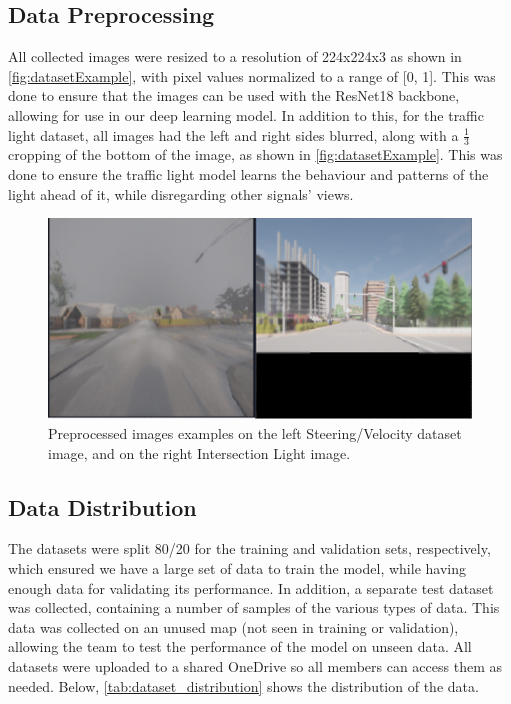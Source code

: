 \documentclass{article} %
\begin{document}
\subsection{Data Preprocessing}

All collected images were resized to a resolution of 224x224x3 as shown in \autoref{fig:datasetExample}, with pixel values normalized to a range of [0, 1].
This was done to ensure that the images can be used with the ResNet18 backbone, allowing for use in our deep learning model. In addition to this, for the traffic light dataset, all images had the left and right sides blurred, along with a \(\frac{1}{3}\) cropping of the bottom of the image, as shown in \autoref{fig:datasetExample}. This was done to ensure the traffic light model learns the behaviour and patterns of the light ahead of it, while disregarding other signals' views.

\begin{figure}[H] %
    \centering
    \includegraphics[width=1.0\textwidth]{example of images in dataset.png} %
    \caption{Preprocessed images examples on the left Steering/Velocity dataset image, and on the right Intersection Light image.}
    \label{fig:datasetExample}
\end{figure}


\subsection{Data Distribution}

The datasets were split 80/20 for the training and validation sets, respectively, which ensured we have a large set of data to train the model, while having enough data for validating its performance. In addition, a separate test dataset was collected, containing a number of samples of the various types of data. 
This data was collected on an unused map (not seen in training or validation), allowing the team to test the performance of the model on unseen data. All datasets were uploaded to a shared OneDrive so all members can access them as needed. Below, \autoref{tab:dataset_distribution} shows the distribution of the data. 
\end{document}
